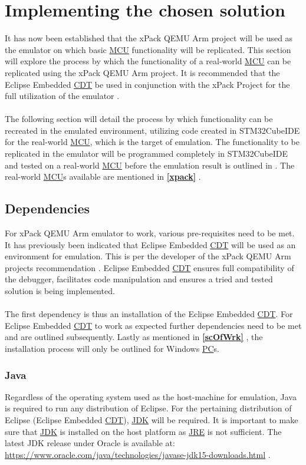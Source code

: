 \section{Implementing the chosen solution}
\label{CompSolu}
It has now been established that the xPack QEMU Arm project will be used as the emulator on which basic \hyperref[listAbr]{MCU} functionality will be replicated. This section will explore the process by which the functionality of a real-world \hyperref[listAbr]{MCU} can be replicated using the xPack QEMU Arm project. It is recommended that the Eclipse Embedded \hyperref[listAbr]{CDT} be used in conjunction with the xPack Project for the full utilization of the emulator \cite{emailIl}.
\\\\
The following section will detail the process by which functionality can be recreated in the emulated environment, utilizing code created in STM32CubeIDE for the real-world \hyperref[listAbr]{MCU}, which is the target of emulation. The functionality to be replicated in the emulator will be programmed completely in STM32CubeIDE and tested on a real-world \hyperref[listAbr]{MCU} before the emulation result is outlined in \textbf{}. The real-world \hyperref[listAbr]{MCU}s available are mentioned in \textbf{\ref{xpack} }.

\subsection{Dependencies}
\label{dependencies}
For xPack QEMU Arm emulator to work, various pre-requisites need to be met. It has previously been  indicated that Eclipse Embedded \hyperref[listAbr]{CDT} will be used as an environment for emulation. This is per the developer of the xPack QEMU Arm projects recommendation \cite{emailIl}. Eclipse Embedded \hyperref[listAbr]{CDT} ensures full compatibility of the debugger, facilitates code manipulation and ensures a tried and tested solution is being implemented.
\\\\
The first dependency is thus an installation of the Eclipse Embedded \hyperref[listAbr]{CDT}. For Eclipse Embedded \hyperref[listAbr]{CDT} to work as expected further dependencies need to be met and are outlined subsequently. Lastly as mentioned in \textbf{\ref{scOfWrk} }, the installation process will only be outlined for Windows \hyperref[listAbr]{PC}s.

\subsubsection{Java}
\label{Java}
Regardless of the operating system used as the host-machine for emulation, Java is required to run any distribution of Eclipse. For the pertaining distribution of Eclipse (Eclipse Embedded \hyperref[listAbr]{CDT}), \hyperref[listAbr]{JDK} will be required. It is important to make sure that \hyperref[listAbr]{JDK} is installed on the host platform as \hyperref[listAbr]{JRE} is not sufficient. The latest JDK release under Oracle is available at: \color{blue}\url{https://www.oracle.com/java/technologies/javase-jdk15-downloads.html} \color{black} \cite{emailIl}\cite{eclipse}.


